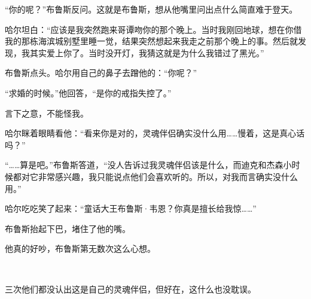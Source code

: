 \documentclass[../main.tex]{subfiles}
\begin{document}
“你的呢？”布鲁斯反问。这就是布鲁斯，想从他嘴里问出点什么简直难于登天。

哈尔坦白：“应该是我突然跑来哥谭吻你的那个晚上。当时我刚回地球，想在你借我的那栋海滨城别墅里睡一觉，结果突然想起来我走之前那个晚上的事。然后就发现，我其实爱上你了。当时没开灯，我猜这就是为什么我错过了黑光。”

布鲁斯点头。哈尔用自己的鼻子去蹭他的：“你呢？”

“求婚的时候。”他回答，“是你的戒指失控了。”

言下之意，不能怪我。

哈尔眯着眼睛看他：“看来你是对的，灵魂伴侣确实没什么用……慢着，这是真心话吗？”

“……算是吧。”布鲁斯答道，“没人告诉过我灵魂伴侣该是什么，而迪克和杰森小时候都对它非常感兴趣，我只能说点他们会喜欢听的。所以，对我而言确实没什么用。”

哈尔吃吃笑了起来：“童话大王布鲁斯·韦恩？你真是擅长给我惊……”

布鲁斯抬起下巴，堵住了他的嘴。

他真的好吵，布鲁斯第无数次这么心想。

~\

三次他们都没认出这是自己的灵魂伴侣，但好在，这什么也没耽误。

\storyend

\end{document}
